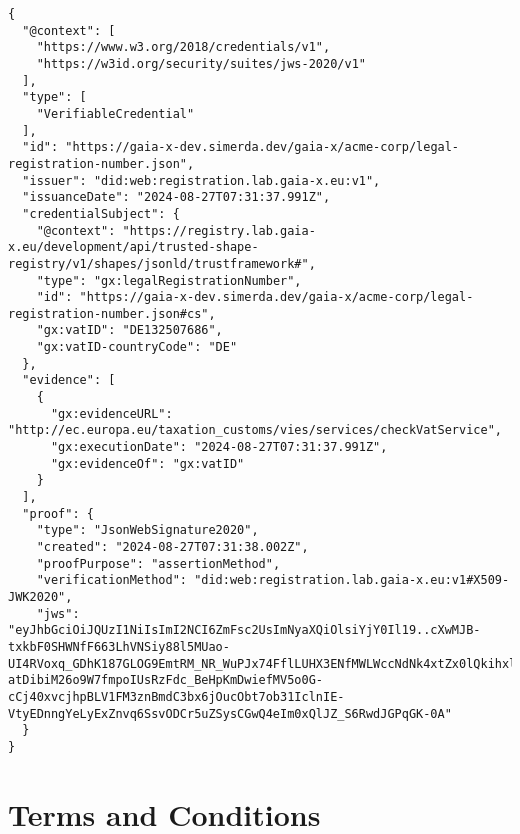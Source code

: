 \begin{verbatim}
{
  "@context": [
    "https://www.w3.org/2018/credentials/v1",
    "https://w3id.org/security/suites/jws-2020/v1"
  ],
  "type": [
    "VerifiableCredential"
  ],
  "id": "https://gaia-x-dev.simerda.dev/gaia-x/acme-corp/legal-registration-number.json",
  "issuer": "did:web:registration.lab.gaia-x.eu:v1",
  "issuanceDate": "2024-08-27T07:31:37.991Z",
  "credentialSubject": {
    "@context": "https://registry.lab.gaia-x.eu/development/api/trusted-shape-registry/v1/shapes/jsonld/trustframework#",
    "type": "gx:legalRegistrationNumber",
    "id": "https://gaia-x-dev.simerda.dev/gaia-x/acme-corp/legal-registration-number.json#cs",
    "gx:vatID": "DE132507686",
    "gx:vatID-countryCode": "DE"
  },
  "evidence": [
    {
      "gx:evidenceURL": "http://ec.europa.eu/taxation_customs/vies/services/checkVatService",
      "gx:executionDate": "2024-08-27T07:31:37.991Z",
      "gx:evidenceOf": "gx:vatID"
    }
  ],
  "proof": {
    "type": "JsonWebSignature2020",
    "created": "2024-08-27T07:31:38.002Z",
    "proofPurpose": "assertionMethod",
    "verificationMethod": "did:web:registration.lab.gaia-x.eu:v1#X509-JWK2020",
    "jws": "eyJhbGciOiJQUzI1NiIsImI2NCI6ZmFsc2UsImNyaXQiOlsiYjY0Il19..cXwMJB-txkbF0SHWNfF663LhVNSiy88l5MUao-UI4RVoxq_GDhK187GLOG9EmtRM_NR_WuPJx74FflLUHX3ENfMWLWccNdNk4xtZx0lQkihxl9oTsEjDWbwedQ2XQjvLz00tMfWAKszxAO1YuhQIUGOIdMUc9A3aPMRc7U1ULGJBhYxYd4YeOzdnno8WQ-atDibiM26o9W7fmpoIUsRzFdc_BeHpKmDwiefMV5o0G-cCj40xvcjhpBLV1FM3znBmdC3bx6jOucObt7ob31IclnIE-VtyEDnngYeLyExZnvq6SsvODCr5uZSysCGwQ4eIm0xQlJZ_S6RwdJGPqGK-0A"
  }
}
\end{verbatim}


\section{Terms and Conditions}

